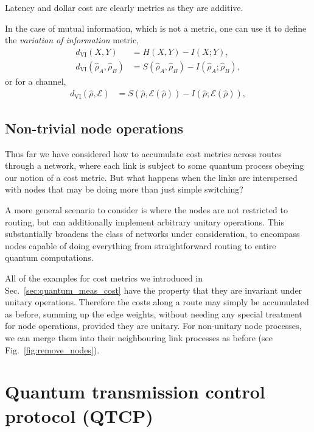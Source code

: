 \documentclass[aps,rmp,twocolumn,amsmath,amssymb,nofootinbib,superscriptaddress]{revtex4}
\begin{document}
Latency and dollar cost are clearly metrics as they are additive.

In the case of mutual information, which is not a metric, one can use it to define the \emph{variation of information} metric,
\begin{align}
d_\mathrm{VI}(X,Y) &= H(X,Y) - I(X;Y), \nonumber \\
d_\mathrm{VI}(\hat\rho_A,\hat\rho_B) &= S(\hat\rho_A,\hat\rho_B) - I(\hat\rho_A;\hat\rho_B),
\end{align}
or for a channel,
\begin{align}
d_\mathrm{VI}(\hat\rho,\mathcal{E}) &= S(\hat\rho,\mathcal{E}(\hat\rho)) - I(\hat\rho;\mathcal{E}(\hat\rho)),
\end{align}

%
%

\subsection{Non-trivial node operations}

Thus far we have considered how to accumulate cost metrics across routes through a network, where each link is subject to some quantum process obeying our notion of a cost metric. But what happens when the links are interspersed with nodes that may be doing more than just simple switching?

A more general scenario to consider is where the nodes are not restricted to routing, but can additionally implement arbitrary unitary operations. This substantially broadens the class of networks under consideration, to encompass nodes capable of doing everything from straightforward routing to entire quantum computations.

All of the examples for cost metrics we introduced in Sec.~\ref{sec:quantum_meas_cost} have the property that they are invariant under unitary operations. Therefore the costs along a route may simply be accumulated as before, summing up the edge weights, without needing any special treatment for node operations, provided they are unitary. For non-unitary node processes, we can merge them into their neighbouring link processes as before (see Fig.~\ref{fig:remove_nodes}).

%
%

\section{Quantum transmission control protocol (QTCP)}
\end{document}
